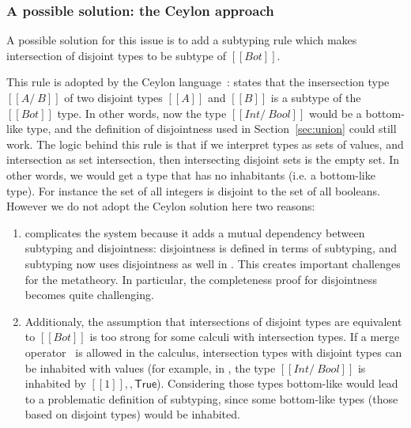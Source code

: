 \subsubsection*{A possible solution: the Ceylon approach}
A possible solution for this issue is to add a subtyping rule which makes intersection of
disjoint types to be subtype of $[[Bot]]$.

\begin{center}
\end{center}

\noindent This rule is adopted by the Ceylon language~\cite{muehlboeck2018empowering}:
 states that the insersection type $[[A /\ B]]$
of two disjoint types $[[A]]$ and $[[B]]$ is a subtype of the $[[Bot]]$ type.
In other words, now the type $[[Int /\ Bool]]$ would be a bottom-like type, and the
definition of disjointness used in Section~\ref{sec:union} could still work.
The logic behind this rule is that if we interpret types as sets of values,
and intersection as set intersection, then intersecting disjoint sets
is the empty set. In other words, we would get a type that has no inhabitants (i.e.
a bottom-like type).
For instance the set of all integers is disjoint to the set of all booleans.
However we do not adopt the Ceylon solution here two reasons:

\begin{enumerate}

\item {} complicates the system because
  it adds a mutual dependency between subtyping and disjointness:
  disjointness is defined in terms of subtyping, and subtyping now
  uses disjointness as well in . This creates important
  challenges for the metatheory. In particular, the completeness proof
  for disjointness becomes quite challenging.

\item Additionaly, the assumption that intersections of disjoint types
  are equivalent to $[[Bot]]$ is too strong for some calculi with intersection
  types. If a merge operator~\cite{reynolds1988preliminary} is allowed in the calculus, 
  intersection types
  with disjoint types can be inhabited with values (for example, in 
  \cite{oliveira2016disjoint},
  the type $[[Int /\ Bool]]$ is inhabited by $[[1]] ,, \mathsf{True}$). Considering those
  types bottom-like would lead to a problematic definition of
  subtyping, since some bottom-like types (those based on disjoint types) would
  be inhabited.

\end{enumerate}

